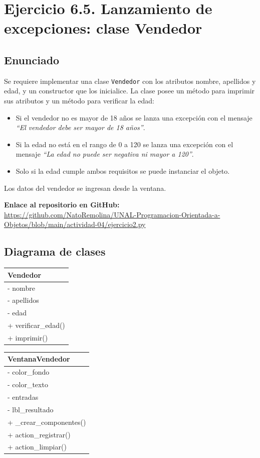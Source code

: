 \documentclass[11pt, a4paper]{article}
\newcommand{\clasebox}[3]{%
\begin{center}
\begin{tabular}{|l|}
\hline
\textbf{#1} \\
\hline
#2
\hline
#3
\hline
\end{tabular}
\end{center}
}
\begin{document}
\newpage
\section{Ejercicio 6.5. Lanzamiento de excepciones: clase Vendedor}

\subsection{Enunciado}
Se requiere implementar una clase \texttt{Vendedor} con los atributos nombre, apellidos y
edad, y un constructor que los inicialice. La clase posee un método para imprimir sus atributos
y un método para verificar la edad:

\begin{itemize}
    \item Si el vendedor no es mayor de 18 años se lanza una excepción con el mensaje
          \textit{``El vendedor debe ser mayor de 18 años''}.
    \item Si la edad no está en el rango de 0 a 120 se lanza una excepción con el mensaje
          \textit{``La edad no puede ser negativa ni mayor a 120''}.
    \item Solo si la edad cumple ambos requisitos se puede instanciar el objeto.
\end{itemize}

\noindent Los datos del vendedor se ingresan desde la ventana.

\noindent \textbf{Enlace al repositorio en GitHub:} \\
\url{https://github.com/NatoRemolina/UNAL-Programacion-Orientada-a-Objetos/blob/main/actividad-04/ejercicio2.py}

\subsection{Diagrama de clases}
\clasebox{Vendedor}
{%
- nombre \\
- apellidos \\
- edad \\
}
{%
+ verificar\_edad() \\
+ imprimir() \\
}

\clasebox{VentanaVendedor}
{%
- color\_fondo \\
- color\_texto \\
- entradas \\
- lbl\_resultado \\
}
{%
+ \_crear\_componentes() \\
+ action\_registrar() \\
+ action\_limpiar() \\
}
\end{document}
